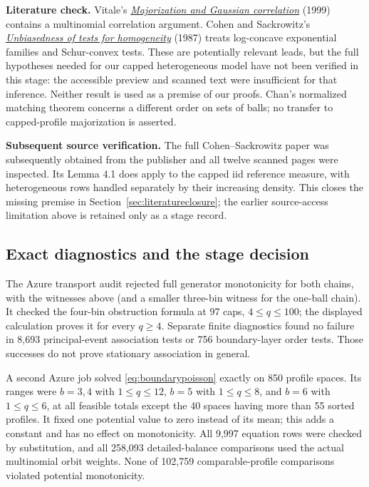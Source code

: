 \documentclass[11pt]{article}
\begin{document}
\noindent\textbf{Literature check.}
Vitale's
\href{https://doi.org/10.1016/S0167-7152(99)00064-4}
{\emph{Majorization and Gaussian correlation}} (1999) contains a
multinomial correlation argument. Cohen and Sackrowitz's
\href{https://doi.org/10.1214/aos/1176350376}
{\emph{Unbiasedness of tests for homogeneity}} (1987) treats
log-concave exponential families and Schur-convex tests.
These are potentially relevant leads, but the full hypotheses needed
for our capped heterogeneous model have not been verified in this
stage: the accessible preview and scanned text were insufficient for
that inference. Neither result is used as a premise of our proofs.
Chan's normalized matching theorem concerns a different order on sets
of balls; no transfer to capped-profile majorization is asserted.

\noindent\textbf{Subsequent source verification.}
The full Cohen--Sackrowitz paper was subsequently obtained from the
publisher and all twelve scanned pages were inspected. Its Lemma 4.1
does apply to the capped iid reference measure, with heterogeneous
rows handled separately by their increasing density. This closes
the missing premise in Section~\ref{sec:literatureclosure}; the earlier
source-access limitation above is retained only as a stage record.

\subsection{Exact diagnostics and the stage decision}
The Azure transport audit rejected full generator monotonicity for
both chains, with the witnesses above (and a smaller three-bin witness
for the one-ball chain). It checked the four-bin obstruction formula
at 97 caps, $4\leq q\leq100$; the displayed calculation proves it
for every $q\geq4$. Separate finite diagnostics found no failure in
8,693 principal-event association tests or 756 boundary-layer order
tests. Those successes do not prove stationary association in general.

A second Azure job solved \eqref{eq:boundarypoisson} exactly on
850 profile spaces. Its ranges were $b=3,4$ with $1\leq q\leq12$,
$b=5$ with $1\leq q\leq8$, and $b=6$ with $1\leq q\leq6$,
at all feasible totals except the 40 spaces having more than
55 sorted profiles. It fixed one potential value to zero instead of
its mean; this adds a constant and has no effect on monotonicity.
All 9,997 equation rows were checked by substitution, and all
258,093 detailed-balance comparisons used the actual multinomial
orbit weights. None of 102,759 comparable-profile comparisons
violated potential monotonicity.
\end{document}
